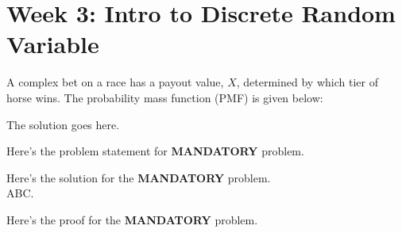 \documentclass[a4paper, 10pt]{article}
\begin{document}
\subject[2110205 - Statistics for Computer Engineering]


\section{Week 3: Intro to Discrete Random Variable}



\begin{problem}
A complex bet on a race has a payout value, \( X \), determined by which tier
of horse wins. The probability mass function (PMF) is given below:
\end{problem}

\begin{solution}
The solution goes here.
\end{solution}


\begin{tosubmit}
\problem
Here's the problem statement for \textbf{MANDATORY} problem.

\par\noindent\submitsolution
Here's the solution for the \textbf{MANDATORY} problem. \\
ABC.

\proof
Here's the proof for the \textbf{MANDATORY} problem.
\end{tosubmit}
\end{document}
